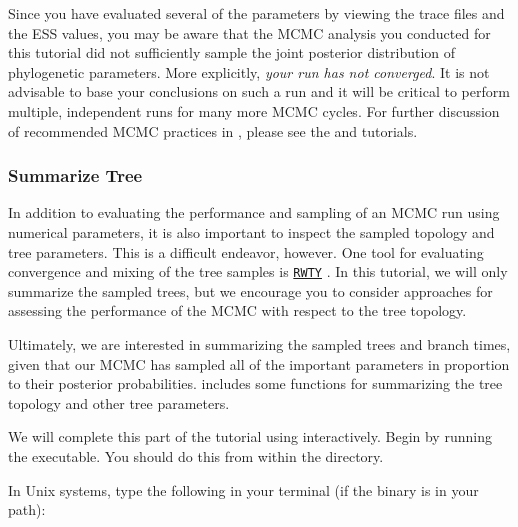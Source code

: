 Since you have evaluated several of the parameters by viewing the trace files and the ESS values, you may be aware that the MCMC analysis you conducted for this tutorial did not sufficiently sample the joint posterior distribution of phylogenetic parameters.
More explicitly, \textit{your run has not converged}.
It is not advisable to base your conclusions on such a run and it will be critical to perform multiple, independent runs for many more MCMC cycles. 
For further discussion of recommended MCMC practices in \RevBayes, please see the \href{https://github.com/revbayes/revbayes_tutorial/raw/master/tutorial_TeX/RB_MCMC_Intro_Tutorial/RB_MCMC_Intro_Tutorial.pdf}{} and \href{https://github.com/revbayes/revbayes_tutorial/raw/master/tutorial_TeX/RB_MCMC_Tutorial/RB_MCMC_Tutorial.pdf}{} tutorials.

\medskip
\subsubsection{Summarize Tree}\label{subsub:Exercise-SummarizeTree}


In addition to evaluating the performance and sampling of an MCMC run using numerical parameters, it is also important to inspect the sampled topology and tree parameters. 
This is a difficult endeavor, however. 
One tool for evaluating convergence and mixing of the tree samples is \href{https://github.com/danlwarren/RWTY}{\tt RWTY} \citep{Warren2016}. 
In this tutorial, we will only summarize the sampled trees, but we encourage you to consider approaches for assessing the performance of the MCMC with respect to the tree topology.

Ultimately, we are interested in summarizing the sampled trees and branch times, given that our MCMC has sampled all of the important parameters in proportion to their posterior probabilities. 
\RevBayes includes some functions for summarizing the tree topology and other tree parameters.


{\begin{framed}
We will complete this part of the tutorial using \RevBayes interactively.
Begin by running the \RevBayes executable. 
You should do this from within the  directory.

In Unix systems, type the following in your terminal (if the \RevBayes binary is in your path):

\colorbox{black}{\strut\hspace{1mm}\textcolor[rgb]{0,1,1}{}\hspace{0.925\textwidth}}
\end{framed}}


